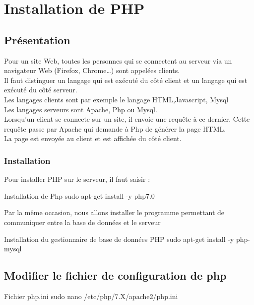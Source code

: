 \chapter{Installation de PHP}

\section{Présentation}
Pour un site Web, toutes les personnes qui se connectent au serveur via un navigateur Web (Firefox, Chrome…) sont appelées clients. \\
Il faut distinguer un langage qui est exécuté du côté client et un langage qui est exécuté du côté serveur. \\

Les langages clients sont par exemple le langage HTML,Javascript, Mysql \\
Les langages serveurs sont Apache, Php ou Mysql. \\

Lorsqu’un client se connecte sur un site, il envoie une requête à ce dernier. Cette requête passe par Apache qui demande à Php de générer la page HTML. \\
La page est envoyée au client et est affichée du côté client. \\


\subsection{Installation}
Pour installer PHP sur le serveur, il faut saisir :

\begin{Bash}{Installation de Php}
sudo apt-get install -y php7.0
\end{Bash}

Par la même occasion, nous allons installer le programme permettant de communiquer entre la base de données et le serveur

\begin{Bash}{Installation du gestionnaire de base de données PHP}
sudo apt-get install -y php-mysql
\end{Bash}


\section{Modifier le fichier de configuration de php}
\begin{Bash}{Fichier php.ini}
sudo nano /etc/php/7.X/apache2/php.ini
\end{Bash}



